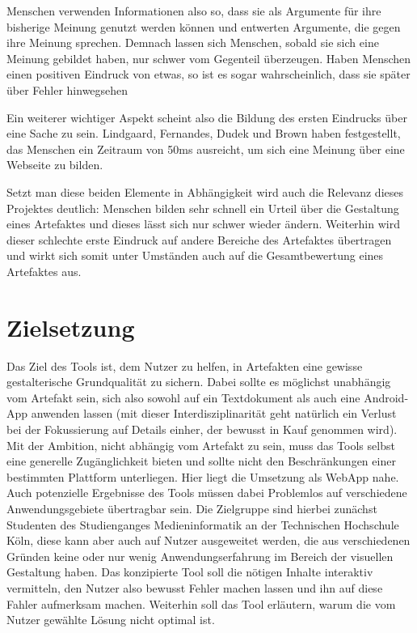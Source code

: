 Menschen verwenden Informationen also so, dass sie als Argumente für ihre bisherige Meinung genutzt werden können und entwerten Argumente, die gegen ihre Meinung sprechen. Demnach lassen sich Menschen, sobald sie sich eine Meinung gebildet haben, nur schwer vom Gegenteil überzeugen.
Haben Menschen einen positiven Eindruck von etwas, so ist es sogar wahrscheinlich, dass sie später über Fehler hinwegsehen \cite{campbell1996fitting}

Ein weiterer wichtiger Aspekt scheint also die Bildung des ersten Eindrucks über eine Sache zu sein. Lindgaard, Fernandes, Dudek und Brown haben festgestellt, das Menschen ein Zeitraum von 50ms ausreicht, um sich eine Meinung über eine Webseite zu bilden. \cite{lindgaard2006attention}

Setzt man diese beiden Elemente in Abhängigkeit wird auch die Relevanz dieses Projektes deutlich: Menschen bilden sehr schnell ein Urteil über die Gestaltung eines Artefaktes und dieses lässt sich nur schwer wieder ändern. Weiterhin wird dieser schlechte erste Eindruck auf andere Bereiche des Artefaktes übertragen und wirkt sich somit unter Umständen auch auf die Gesamtbewertung eines Artefaktes aus.


\section{Zielsetzung}
Das Ziel des Tools ist, dem Nutzer zu helfen, in Artefakten eine gewisse gestalterische Grundqualität zu sichern. Dabei sollte es möglichst unabhängig vom Artefakt sein, sich also sowohl auf ein Textdokument als auch eine Android-App anwenden lassen (mit dieser Interdisziplinarität geht natürlich ein Verlust bei der Fokussierung auf Details einher, der bewusst in Kauf genommen wird).
Mit der Ambition, nicht abhängig vom Artefakt zu sein, muss das Tools selbst eine generelle Zugänglichkeit bieten und sollte nicht den Beschränkungen einer bestimmten Plattform unterliegen. Hier liegt die Umsetzung als WebApp nahe. Auch potenzielle Ergebnisse des Tools müssen dabei Problemlos auf verschiedene Anwendungsgebiete übertragbar sein.
Die Zielgruppe sind hierbei zunächst Studenten des Studienganges Medieninformatik an der Technischen Hochschule Köln, diese kann aber auch auf Nutzer ausgeweitet werden, die aus verschiedenen Gründen keine oder nur wenig Anwendungserfahrung im Bereich der visuellen Gestaltung haben.
Das konzipierte Tool soll die nötigen Inhalte interaktiv vermitteln, den Nutzer also bewusst Fehler machen lassen und ihn auf diese Fahler aufmerksam machen. Weiterhin soll das Tool erläutern, warum die vom Nutzer gewählte Lösung nicht optimal ist.

